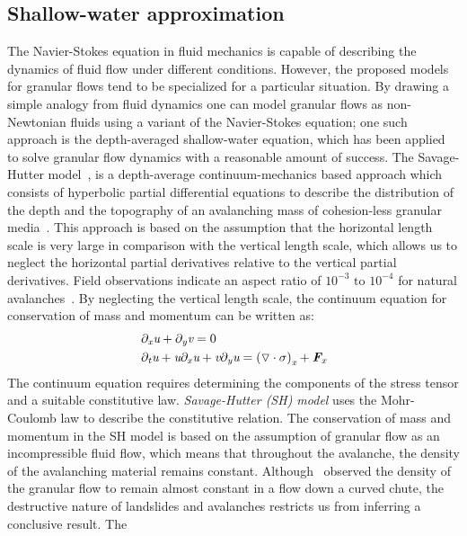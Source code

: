\subsection{Shallow-water approximation}
The Navier-Stokes equation in fluid mechanics is capable of describing the 
dynamics of fluid flow under different conditions. However, the proposed models 
for granular flows tend to be specialized for a particular situation. By 
drawing a simple analogy from fluid dynamics one can model granular flows as 
non-Newtonian fluids using a variant of the Navier-Stokes equation; one such 
approach is the depth-averaged shallow-water equation, which has been applied 
to solve granular flow dynamics with a reasonable amount of success. The 
Savage-Hutter model~\citep{Savage1991}, is a depth-average continuum-mechanics 
based approach which consists of hyperbolic partial differential equations to 
describe the distribution of the depth and the topography of an avalanching 
mass of cohesion-less granular media~\citep{Hutter2005}. This approach is based 
on the assumption that the horizontal length scale is very large in comparison 
with the vertical length scale, which allows us to neglect the horizontal 
partial derivatives relative to the vertical partial derivatives. Field 
observations indicate an aspect ratio of $10^{-3} \mbox{ to } 10^{-4}$ for 
natural avalanches~\citep{Cawthor2006}. By neglecting the vertical length 
scale, the continuum equation for conservation of mass and momentum can be 
written as:
\begin{align}
& \partial_{\textit{x}}\textit{u}+\partial_{\textit{y}}\textit{v}=0 \\
& \partial_{\textit{t}}\textit{u}+\textit{u}\partial_{\textit{x}}\textit{u} + 
\textit{v}\partial_{\textit{y}}\textit{u}=\left(\triangledown \cdot \sigma 
\right)_{\textit{x}} +\textit{\textbf{F}}_{\textit{x}}
\end{align}
The continuum equation requires determining the components of the stress tensor 
and a suitable constitutive law. \textit{Savage-Hutter (SH) model} uses the 
Mohr-Coulomb law to describe the constitutive relation. The conservation of 
mass and momentum in the SH model is based on the assumption of granular flow 
as an incompressible fluid flow, which means that throughout the avalanche, the 
density of the avalanching material remains constant. 
Although~\citet{Hutter1995} observed the density of the granular flow to remain 
almost constant in a flow down a curved chute, the destructive nature of 
landslides and avalanches restricts us from inferring a conclusive result. The 
